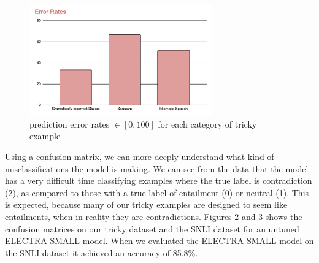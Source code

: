 \documentclass{article}
\begin{document}
\begin{figure}[!h]
	\centering
	\includegraphics[width=0.7\textwidth]{figures/error_rates.png}
	\caption{prediction error rates $\in [0, 100]$ for each category of tricky example}
\end{figure}

Using a confusion matrix, we can more deeply understand what kind of misclassifications the model is making. We can see from the data that the model has a very
difficult time classifying examples where the true label is contradiction (2), as compared to those with a true label of entailment (0) or neutral (1). This is expected, because many of our tricky examples
are designed to seem like entailments, when in reality they are contradictions. Figures 2 and 3 shows the confusion
matrices on our tricky dataset and the SNLI dataset for an untuned ELECTRA-SMALL model. When we evaluated the ELECTRA-SMALL
model on the SNLI dataset it achieved an accuracy of 85.8\%.
\end{document}

